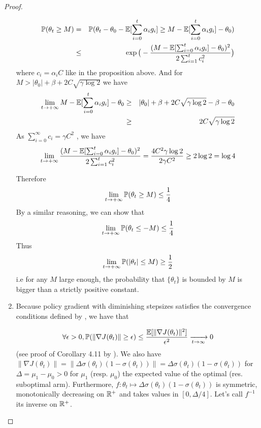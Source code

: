 \begin{proof}
\begin{enumerate}
\begin{eqnarray*}
{\mathbb{P}}(\theta_t  \ge M) &=& {\mathbb{P}}(\theta_t - \theta_0 - \mathbb{E}[\sum_{i=0}^{t} \alpha_i g_i] \ge M - \mathbb{E}[\sum_{i=0}^{t} \alpha_i g_i] - \theta_0)\\
&\le& \exp\big( -\frac{( M - \mathbb{E}[\sum_{i=0}^{t} \alpha_i g_i] - \theta_0)^2}{2\sum_{i=1}^t c_i^2}\big)\\
\end{eqnarray*}
where $c_i = \alpha_i C$ like in the proposition above.
And for $M > |\theta_0| + \beta + 2 C \sqrt{\gamma \log 2}$ we have 
\begin{eqnarray*}
\lim_{t \to +\infty} M - \mathbb{E}[\sum_{i=0}^{t} \alpha_i g_i] - \theta_0 &\ge&  |\theta_0| + \beta + 2 C \sqrt{\gamma \log 2} - \beta - \theta_0\\
&\ge& 2 C \sqrt{\gamma \log 2}\\
\end{eqnarray*}
As $\sum_{i=0}^\infty c_i = \gamma C^2$ , we have
$$\lim_{t \to +\infty} \frac{( M - \mathbb{E}[\sum_{i=0}^{t} \alpha_i g_i] - \theta_0)^2}{2\sum_{i=1}^t c_i^2} = \frac{4 C^2 \gamma \log 2}{2 \gamma C^2 } \ge 2\log 2 = \log 4 $$

Therefore
$$\lim_{t \to +\infty} {\mathbb{P}}(\theta_t \ge M) \le \frac{1}{4}$$
By a similar reasoning, we can show that 
$$\lim_{t \to +\infty} {\mathbb{P}}(\theta_t \le -M) \le \frac{1}{4}$$
Thus $$\lim_{t \to +\infty} {\mathbb{P}}(|\theta_t| \le M) \ge \frac{1}{2}$$ i.e for any $M$ large enough, the probability  that $\{\theta_t\}$ is bounded by $M$ is bigger than a strictly positive constant.


\item
Because policy gradient with diminishing stepsizes satisfies the convergence conditions defined by \cite{bottou2018optimization}, we have that

$$\forall \epsilon > 0, {\mathbb{P}}(\|\nabla J(\theta_t)\| \ge \epsilon) \le  \frac{\mathbb{E}[\|\nabla J(\theta_t)\|^2]}{\epsilon^2} \xrightarrow[t \to \infty]{} 0 $$
(see proof of Corollary 4.11 by \cite{bottou2018optimization}).
We also have $\|\nabla J(\theta_t)\|=\| \Delta  \sigma(\theta_t) (1-\sigma(\theta_t)) \| = \Delta  \sigma(\theta_t) (1-\sigma(\theta_t))$ for $\Delta = \mu_1 - \mu_0 > 0$ for $\mu_1$ (resp. $\mu_0$) the expected value of the optimal (res. suboptimal arm). Furthermore, $f: \theta_t \mapsto \Delta  \sigma(\theta_t) (1-\sigma(\theta_t))$ is symmetric, monotonically decreasing on $\mathbb{R}^+$ and takes values in $[0, \Delta  /4]$. Let's call $f^{-1}$ its inverse on $\mathbb{R}^+$.


\end{enumerate}
\end{proof}
